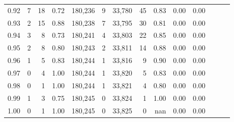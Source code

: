 \begin{tabular}{rrrrrrrrrrrrrr}
0.92 &      7 &     18 &  0.72 &  180,236 &        9 &  33,780 &      45 &  0.83 &  0.00 &      0.00 \\
0.93 &      2 &     15 &  0.88 &  180,238 &        7 &  33,795 &      30 &  0.81 &  0.00 &      0.00 \\
0.94 &      3 &      8 &  0.73 &  180,241 &        4 &  33,803 &      22 &  0.85 &  0.00 &      0.00 \\
0.95 &      2 &      8 &  0.80 &  180,243 &        2 &  33,811 &      14 &  0.88 &  0.00 &      0.00 \\
0.96 &      1 &      5 &  0.83 &  180,244 &        1 &  33,816 &       9 &  0.90 &  0.00 &      0.00 \\
0.97 &      0 &      4 &  1.00 &  180,244 &        1 &  33,820 &       5 &  0.83 &  0.00 &      0.00 \\
0.98 &      0 &      1 &  1.00 &  180,244 &        1 &  33,821 &       4 &  0.80 &  0.00 &      0.00 \\
0.99 &      1 &      3 &  0.75 &  180,245 &        0 &  33,824 &       1 &  1.00 &  0.00 &      0.00 \\
1.00 &      0 &      1 &  1.00 &  180,245 &        0 &  33,825 &       0 &   nan &  0.00 &      0.00 \\
\bottomrule
\end{tabular}
